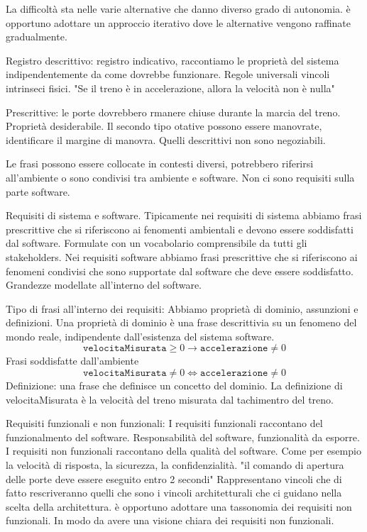 \documentclass[oneside,a4paper,11pt]{book}
\theoremstyle{italicstyle}
\theoremstyle{normStyle}
\begin{document}
La difficoltà sta nelle varie alternative che danno diverso grado di 
autonomia. è opportuno adottare un approccio iterativo dove le 
alternative vengono raffinate gradualmente. 

Registro descrittivo: registro indicativo, raccontiamo le proprietà del 
sistema indipendentemente da come dovrebbe funzionare. Regole universali 
vincoli intrinseci fisici. 
"Se il treno è in accelerazione, allora la velocità non è nulla"

Prescrittive: le porte dovrebbero rmanere chiuse durante
la marcia del treno. Proprietà desiderabile. Il secondo tipo otative possono 
essere manovrate, identificare il margine di manovra. Quelli descrittivi non sono 
negoziabili.

Le frasi possono essere collocate in contesti diversi, potrebbero riferirsi 
all'ambiente o sono condivisi tra ambiente e software.
Non ci sono requisiti sulla parte software.

Requisiti di sistema e software. Tipicamente nei requisiti di sistema abbiamo 
frasi prescrittive che si riferiscono ai fenomenti ambientali e devono 
essere soddisfatti dal software. Formulate con un vocabolario comprensibile 
da tutti gli stakeholders.
Nei requisiti software abbiamo frasi prescrittive che si riferiscono
ai fenomeni condivisi che sono supportate dal software che deve 
essere soddisfatto. Grandezze modellate all'interno del software.

Tipo di frasi all'interno dei requisiti:
Abbiamo proprietà di dominio, assunzioni e definizioni.
Una proprietà di dominio è una frase descrittivia su un fenomeno del mondo
reale, indipendente dall'esistenza del sistema software.
\[
  \texttt{velocitaMisurata} \geq 0 \rightarrow \texttt{accelerazione} \not = 0
\] 
Frasi soddisfatte dall'ambiente 
\[
\texttt{velocitaMisurata} \not = 0 \Leftrightarrow \texttt{accelerazione} \not = 0
\]
Definizione: una frase che definisce un concetto del dominio.
La definizione di velocitaMisurata è la velocità del treno misurata
dal tachimentro del treno.

Requisiti funzionali e non funzionali:
I requisiti funzionali raccontano del funzionalmento del software. 
Responsabilità del software, funzionalità da esporre.
I requisiti non funzionali raccontano della qualità del software.
Come per esempio la velocità di risposta, la sicurezza,
la confidenzialità.
"il comando di apertura delle porte deve essere eseguito entro 2 secondi"
Rappresentano vincoli che di fatto rescriveranno quelli che sono i vincoli 
architetturali che ci guidano nella scelta della architettura.
è opportuno adottare una tassonomia dei requisiti non funzionali. In modo 
da avere una visione chiara dei requisiti non funzionali.
\end{document}
